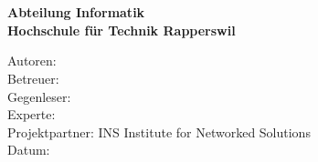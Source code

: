 \begin{titlepage}
\begin{flushleft}
{\Huge \bfseries \TITLE}\\[4cm]
{\huge \bfseries \SUBTITLE}\\[0.5cm]

{\large \bfseries Abteilung Informatik}\\
{\large \bfseries Hochschule für Technik Rapperswil}\\

\vfill

Autoren: \AUTHOR \\
Betreuer: \SUPERVISOR \\
Gegenleser: \GEGENLESER \\
Experte: \EXPERTE \\
Projektpartner: INS Institute for Networked Solutions \\
Datum: {\DATE}

\end{flushleft}
\end{titlepage}
